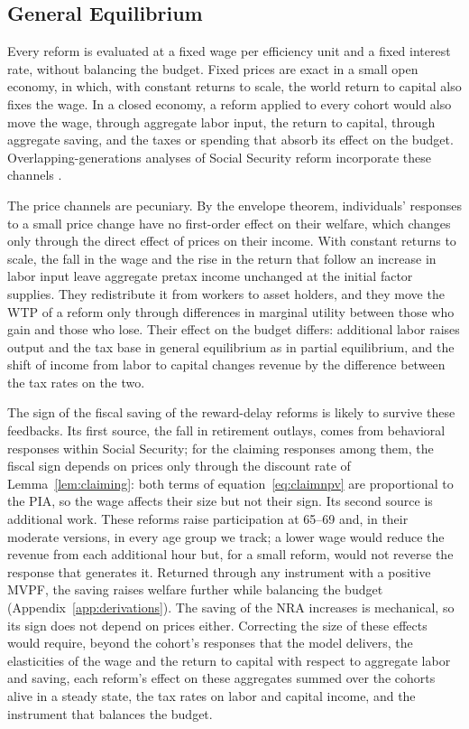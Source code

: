 \subsection{General Equilibrium}\label{sec:disc_ge}

Every reform is evaluated at a fixed wage per efficiency unit and a fixed interest rate, without balancing the budget. Fixed prices are exact in a small open economy, in which, with constant returns to scale, the world return to capital also fixes the wage. In a closed economy, a reform applied to every cohort would also move the wage, through aggregate labor input, the return to capital, through aggregate saving, and the taxes or spending that absorb its effect on the budget. Overlapping-generations analyses of Social Security reform incorporate these channels \citep{Conesa1999social,nishiyama2007does,Imrohoroglu2012,Kitao2014sustainable}.

The price channels are pecuniary. By the envelope theorem, individuals' responses to a small price change have no first-order effect on their welfare, which changes only through the direct effect of prices on their income. With constant returns to scale, the fall in the wage and the rise in the return that follow an increase in labor input leave aggregate pretax income unchanged at the initial factor supplies. They redistribute it from workers to asset holders, and they move the WTP of a reform only through differences in marginal utility between those who gain and those who lose. Their effect on the budget differs: additional labor raises output and the tax base in general equilibrium as in partial equilibrium, and the shift of income from labor to capital changes revenue by the difference between the tax rates on the two.

The sign of the fiscal saving of the reward-delay reforms is likely to survive these feedbacks. Its first source, the fall in retirement outlays, comes from behavioral responses within Social Security; for the claiming responses among them, the fiscal sign depends on prices only through the discount rate of Lemma~\ref{lem:claiming}: both terms of equation~\eqref{eq:claimnpv} are proportional to the PIA, so the wage affects their size but not their sign. Its second source is additional work. These reforms raise participation at 65--69 and, in their moderate versions, in every age group we track; a lower wage would reduce the revenue from each additional hour but, for a small reform, would not reverse the response that generates it. Returned through any instrument with a positive MVPF, the saving raises welfare further while balancing the budget (Appendix~\ref{app:derivations}). The saving of the NRA increases is mechanical, so its sign does not depend on prices either. Correcting the size of these effects would require, beyond the cohort's responses that the model delivers, the elasticities of the wage and the return to capital with respect to aggregate labor and saving, each reform's effect on these aggregates summed over the cohorts alive in a steady state, the tax rates on labor and capital income, and the instrument that balances the budget.

